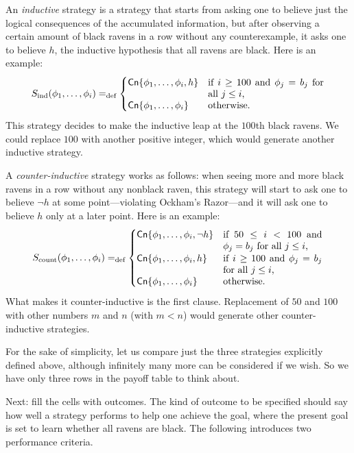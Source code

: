An {\em inductive} strategy is a strategy that starts from asking one to believe just the logical consequences of the accumulated information, but after observing a certain amount of black ravens in a row without any counterexample, it asks one to believe $h$, the inductive hypothesis that all ravens are black. Here is an example:
$$S_{\textrm{ind}} (\phi_1, \ldots, \phi_i) =_\text{def} 
	\begin{cases}
	\mathsf{Cn}\{\phi_1, \ldots, \phi_i, h\} & \parbox[t]{.35\textwidth}{if $i \ge 100$ and $\phi_{j} = b_{j}$ for all $j \le i$,}\\
	\mathsf{Cn}\{\phi_1, \ldots, \phi_i\} & \mbox{otherwise.}
	\end{cases}$$
This strategy decides to make the inductive leap at the $100$th black ravens. We could replace $100$ with another positive integer, which would generate another inductive strategy.

A {\em counter-inductive} strategy works as follows: when seeing more and more black ravens in a row without any nonblack raven, this strategy will start to ask one to believe $\neg h$ at some point---violating Ockham's Razor---and it will ask one to believe $h$ only at a later point. Here is an example:
$$
S_{\textrm{count}} (\phi_1, \ldots, \phi_i) =_\text{def} 
	\begin{cases}
	\mathsf{Cn}\{\phi_1, \ldots, \phi_i, \neg h\} & \parbox[t]{.3\textwidth}{if $50 \le i < 100$ and $\phi_{j} = b_{j}$ for all $j \le i$,}\\

	\mathsf{Cn}\{\phi_1, \ldots, \phi_i, h\} & \parbox[t]{.3\textwidth}{if $i \ge 100$ and $\phi_{j} = b_{j}$ for all $j \le i$,}\\

	\mathsf{Cn}\{\phi_1, \ldots, \phi_i\} & \mbox{otherwise.}
	\end{cases}
$$
What makes it counter-inductive is the first clause. Replacement of $50$ and $100$ with other numbers $m$ and $n$ (with $m < n$) would generate other counter-inductive strategies. 

For the sake of simplicity, let us compare just the three strategies explicitly defined above, although infinitely many more can be considered if we wish. So we have only three rows in the payoff table to think about.

Next: fill the cells with outcomes. The kind of outcome to be specified should say how well a strategy performs to help one achieve the goal, where the present goal is set to learn whether all ravens are black. The following introduces two performance criteria.

